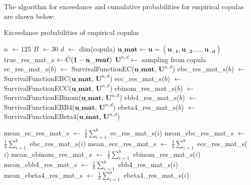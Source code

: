 \documentclass[12pt]{report}
\newcommand{\1}{\mathbf{1}}
\begin{document}
\begin{flushleft}
The algorithm for exceedance and cumulative probabilities for empirical copulas are shown below: \\
\begin{algorithm}[H]
\caption{Exceedance probabilities of empirical copulas}
\begin{algorithmic}
 
    \State $n$ $\gets 125$
    \State $B$ $\gets 30$
    \State $d$ $\gets$ dim(copula)
    \State $\boldsymbol{u\_mat} \gets \boldsymbol{u} = (\boldsymbol{u_{\cdot,1}}, \boldsymbol{u_{\cdot,2}}, \dots, \boldsymbol{u_{\cdot,d}})$ 
    \State true\_res\_mat\_s $\gets \Bar{C}(\boldsymbol{1} - \boldsymbol{u\_mat})$ 
        \State $\boldsymbol{U}^{n,d} \gets$ sampling from copula 
        \State ec\_res\_mat\_s($b$) $\gets$ SurvivalFunctionEC($\boldsymbol{u\_mat}$, $\textbf{U}^{n,d}$)
        \State ebc\_res\_mat\_s($b$) $\gets$ SurvivalFunctionEBC($\boldsymbol{u\_mat}$, $\textbf{U}^{n,d}$)
        \State ecc\_res\_mat\_s($b$) $\gets$ SurvivalFunctionECC($\boldsymbol{u\_mat}$, $\textbf{U}^{n,d}$)
        \State ebinom\_res\_mat\_s($b$) $\gets$ SurvivalFunctionEBinom($\boldsymbol{u\_mat}$, $\textbf{U}^{n,d}$)
        \State ebb4\_res\_mat\_s($b$) $\gets$ SurvivalFunctionEBB4($\boldsymbol{u\_mat}$, $\textbf{U}^{n,d}$)
        \State ebeta4\_res\_mat\_s($b$) $\gets$ SurvivalFunctionEBeta4($\boldsymbol{u\_mat}$, $\textbf{U}^{n,d}$)

    \EndFor
    \State mean\_ec\_res\_mat\_s $\gets$ $\frac{1}{b}\sum\limits_{i = 1}^{b}$ ec\_res\_mat\_s($i$)
    \State mean\_ebc\_res\_mat\_s $\gets$ $\frac{1}{b}\sum\limits_{i = 1}^{b}$ ebc\_res\_mat\_s($i$)
    \State mean\_ecc\_res\_mat\_s $\gets$ $\frac{1}{b}\sum\limits_{i = 1}^{b}$ ecc\_res\_mat\_s($i$)
    \State mean\_ebinom\_res\_mat\_s $\gets$ $\frac{1}{b}\sum\limits_{i = 1}^{b}$ ebinom\_res\_mat\_s($i$)
    \State mean\_ebb4\_res\_mat\_s $\gets$ $\frac{1}{b}\sum\limits_{i = 1}^{b}$ ebb4\_res\_mat\_s($i$)
    \State mean\_ebeta4\_res\_mat\_s $\gets$ $\frac{1}{b}\sum\limits_{i = 1}^{b}$ ebeta4\_res\_mat\_s($i$)


\end{algorithmic}
\end{algorithm}
\end{flushleft}
\end{document}

